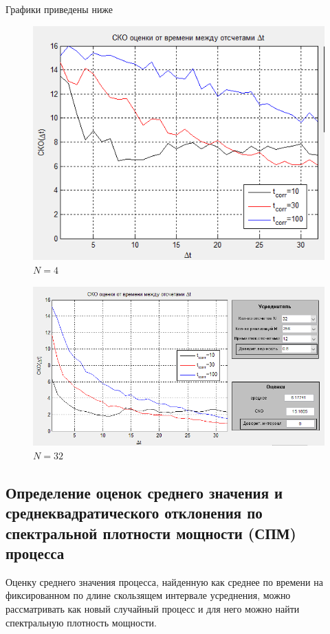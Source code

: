 Графики приведены ниже
\begin{figure}[H]
	\centering
    \includegraphics[width=\linewidth]{fig/fig41}
	\caption*{$N = 4$}
\end{figure}

\begin{figure}[H]
	\centering
    \includegraphics[width=\linewidth]{fig/fig42}
	\caption*{$N = 32$}
\end{figure}
\subsection[Задание 5]{Определение оценок среднего значения и среднеквадратического отклонения по спектральной плотности мощности (СПМ) процесса}
Оценку среднего значения процесса, найденную как среднее по времени на фиксированном по длине скользящем интервале усреднения, можно рассматривать как новый случайный процесс и для него можно найти спектральную плотность мощности.

